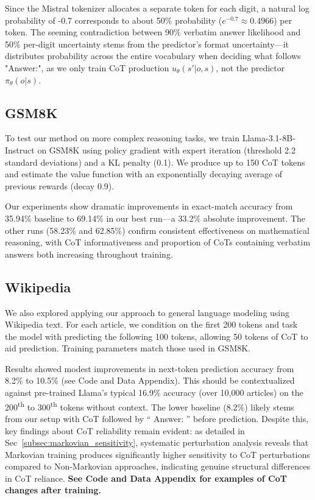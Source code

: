 \documentclass[letterpaper]{article} %
\begin{document}
Since the Mistral tokenizer allocates a separate token for each digit, a natural log probability of -0.7 corresponds to about 50\% probability ($e^{-0.7} \approx 0.4966$) per token. The seeming contradiction between 90\% verbatim answer likelihood and 50\% per-digit uncertainty stems from the predictor's format uncertainty—it distributes probability across the entire vocabulary when deciding what follows "Answer:", as we only train CoT production $u_\theta(s'|o,s)$, not the predictor $\pi_\theta(o|s)$.

\subsection{GSM8K}
\label{subsec:gsm8k}
To test our method on more complex reasoning tasks, we train Llama-3.1-8B-Instruct on GSM8K using policy gradient with expert iteration (threshold 2.2 standard deviations) and a KL penalty (0.1). We produce up to 150 CoT tokens and estimate the value function with an exponentially decaying average of previous rewards (decay 0.9).

Our experiments show dramatic improvements in exact-match accuracy from 35.94\% baseline to 69.14\% in our best run—a 33.2\% absolute improvement. The other runs (58.23\% and 62.85\%) confirm consistent effectiveness on mathematical reasoning, with CoT informativeness and proportion of CoTs containing verbatim answers both increasing throughout training.

\subsection{Wikipedia}
\label{subsec:wikipedia}

We also explored applying our approach to general language modeling using Wikipedia text. For each article, we condition on the first 200 tokens and task the model with predicting the following 100 tokens, allowing 50 tokens of CoT to aid prediction. Training parameters match those used in GSM8K.

Results showed modest improvements in next-token prediction accuracy from 8.2\% to 10.5\% (see Code and Data Appendix). This should be contextualized against pre-trained Llama's typical 16.9\% accuracy (over 10,000 articles) on the 200\textsuperscript{th} to 300\textsuperscript{th} tokens without context. The lower baseline (8.2\%) likely stems from our setup with CoT followed by `` Answer: '' before prediction. Despite this, key findings about CoT reliability remain evident: as detailed in Sec~\ref{subsec:markovian_sensitivity}, systematic perturbation analysis reveals that Markovian training produces significantly higher sensitivity to CoT perturbations compared to Non-Markovian approaches, indicating genuine structural differences in CoT reliance.
\textbf{See Code and Data Appendix for examples of CoT changes after training.}
\end{document}
